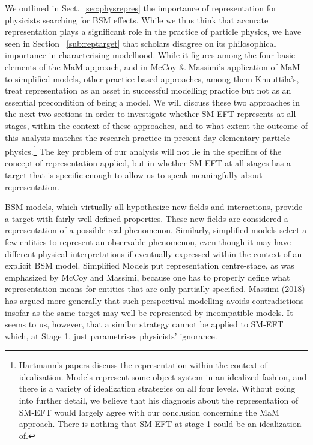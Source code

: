 We outlined in Sect.~\ref{sec:physrepres} the importance of representation for physicists searching for BSM effects. 
While we thus think that accurate representation plays a significant role in the practice of particle physics, we have seen in Section ~\ref{sub:reptarget} that scholars disagree on its philosophical importance in characterising modelhood. 
While it figures among the four basic elements of the MaM approach, and in McCoy \& Massimi's application of MaM to simplified models, other practice-based approaches, among them Knuuttila's, treat representation as an asset in successful modelling practice but not as an essential precondition of being a model. 
We will discuss these two approaches in the next two sections in order to investigate whether SM-EFT represents at all stages, within the context of these approaches, and to what extent the outcome of this analysis matches the research practice in present-day elementary particle physics.\footnote{Hartmann's papers discuss the representation within the context of idealization. Models represent some object system in an idealized fashion, and there is a variety of idealization strategies on all four levels. Without going into further detail, we believe that his diagnosis about the representation of SM-EFT would largely agree with our conclusion concerning the MaM approach. There is nothing that SM-EFT at stage 1 could be an idealization of.}
The key problem of our analysis will not lie in the specifics of the concept of representation applied, but in whether SM-EFT at all stages has a target that is specific enough to allow us to speak meaningfully about representation.

BSM models, which virtually all hypothesize new fields and interactions, provide a target with fairly well defined properties. 
These new fields are considered a representation of a possible real phenomenon.
Similarly, simplified models select a few entities to represent an observable phenomenon, even though it may have different physical interpretations if eventually expressed within the context of an explicit BSM model.
Simplified Models put representation centre-stage, as was emphasized by McCoy and Massimi, because one has to properly define what representation means for entities that are only partially specified. Massimi (2018) has argued more generally that such perspectival modelling avoids contradictions insofar as the same target may well be represented by incompatible models. It seems to us, however, that a similar strategy cannot be applied to SM-EFT which, at Stage 1, just parametrises physicists' ignorance. 

